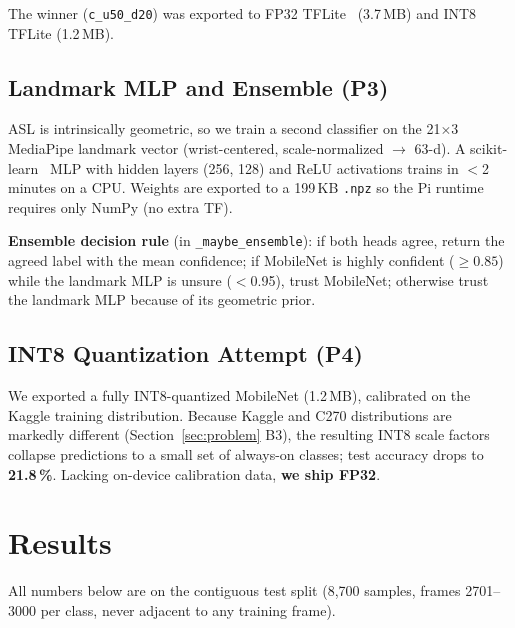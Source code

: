 \documentclass[sigconf,nonacm]{acmart}
\begin{document}
The winner (\texttt{c\_u50\_d20}) was exported to FP32 TFLite~\cite{tflite} (3.7\,MB)
and INT8 TFLite (1.2\,MB).

\subsection{Landmark MLP and Ensemble (P3)}

ASL is intrinsically geometric, so we train a second classifier on the
21${\times}$3 MediaPipe landmark vector (wrist-centered,
scale-normalized $\to$ 63-d).  A scikit-learn~\cite{sklearn} MLP with hidden layers
(256, 128) and ReLU activations trains in $<$2 minutes on a CPU.
Weights are exported to a 199\,KB \texttt{.npz} so the Pi runtime
requires only NumPy (no extra TF).

\textbf{Ensemble decision rule} (in \texttt{\_maybe\_ensemble}): if
both heads agree, return the agreed label with the mean confidence; if
MobileNet is highly confident (${\geq}0.85$) while the landmark MLP is
unsure ($<$0.95), trust MobileNet; otherwise trust the landmark MLP
because of its geometric prior.

\subsection{INT8 Quantization Attempt (P4)}

We exported a fully INT8-quantized MobileNet (1.2\,MB), calibrated on
the Kaggle training distribution.  Because Kaggle and C270 distributions
are markedly different (Section~\ref{sec:problem} B3), the resulting
INT8 scale factors collapse predictions to a small set of always-on
classes; test accuracy drops to \textbf{21.8\,\%}.  Lacking on-device
calibration data, \textbf{we ship FP32}.

\section{Results}

All numbers below are on the contiguous test split (8,700 samples,
frames 2701--3000 per class, never adjacent to any training frame).
\end{document}
